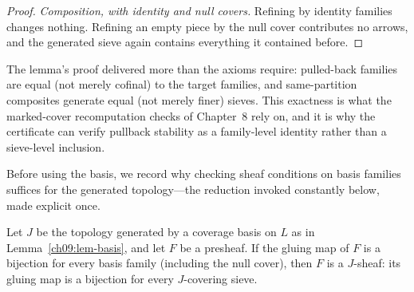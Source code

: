 \begin{proof}
\emph{Composition, with identity and null covers.} Refining by identity families changes nothing. Refining an empty piece by the null cover contributes no arrows, and the generated sieve again contains everything it contained before.
\end{proof}

\begin{remark}\label{ch09:rem-basis-strength}
The lemma's proof delivered more than the axioms require: pulled-back families are equal (not merely cofinal) to the target families, and same-partition composites generate equal (not merely finer) sieves. This exactness is what the marked-cover recomputation checks of Chapter~8 rely on, and it is why the certificate can verify pullback stability as a family-level identity rather than a sieve-level inclusion.
\end{remark}

Before using the basis, we record why checking sheaf conditions on basis families suffices for the generated topology---the reduction invoked constantly below, made explicit once.

\begin{lemma}\label{ch09:lem-basis-suffices}
Let $J$ be the topology generated by a coverage basis on $L$ as in Lemma~\ref{ch09:lem-basis}, and let $F$ be a presheaf. If the gluing map of $F$ is a bijection for every basis family (including the null cover), then $F$ is a $J$-sheaf: its gluing map is a bijection for every $J$-covering sieve.
\end{lemma}

